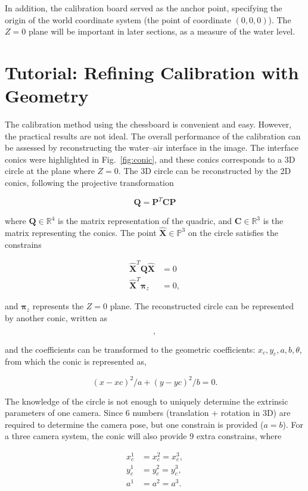 \documentclass[11pt,twoside]{report}
\begin{document}
In addition, the calibration board served as the anchor point, specifying the origin of the world coordinate system (the point of coordinate $(0, 0, 0)$). The $Z=0$ plane will be important in later sections, as a measure of the water level.


\section{Tutorial: Refining Calibration with Geometry}

The calibration method using the chessboard is convenient and easy. However, the practical results are not ideal. The overall performance of the calibration can be assessed by reconstructing the water--air interface in the image. The interface conics were highlighted in Fig.~\ref{fig:conic}, and these conics corresponds to a 3D circle at the plane where $Z=0$. The 3D circle can be reconstructed by the 2D conics, following the projective transformation

$$
\mathbf{Q} = \mathbf{P}^T \mathbf{C} \mathbf{P}
$$

\noindent where $\mathbf{Q} \in \mathbb{R}^4$ is the matrix representation of the quadric, and $\mathbf{C} \in \mathbb{R}^3$ is the matrix representing the conics. The point $\hat{\mathbf{X}} \in \mathbb{P}^3$ on the circle satisfies the constrains

$$
\begin{aligned}
\hat{\mathbf{X}}^T \mathbf{Q} \hat{\mathbf{X}} &= 0 \\
\hat{\mathbf{X}}^T \boldsymbol{\pi}_z &= 0,
\end{aligned}
$$

\noindent and $\boldsymbol{\pi}_z$ represents the $Z=0$ plane. The reconstructed circle can be represented by another conic, written as

$$
,
$$

\noindent and the coefficients can be transformed to the geometric coefficients: $x_c, y_c, a, b, \theta$, from which the conic is represented as,

$$
(x - xc)^2 / a + (y - yc)^2 / b = 0.
$$

The knowledge of the circle is not enough to uniquely determine the extrinsic parameters of one camera. Since 6 numbers (translation + rotation in 3D) are required to determine the camera pose, but one constrain is provided ($a = b$). For a three camera system, the conic will also provide 9 extra constrains, where

$$
\begin{aligned}
x_c^1 &= x_c^2 = x_c^3,\\
y_c^1 &= y_c^2 = y_c^3,\\
a^1 &= a^2 = a^3.
\end{aligned}
$$
\end{document}
